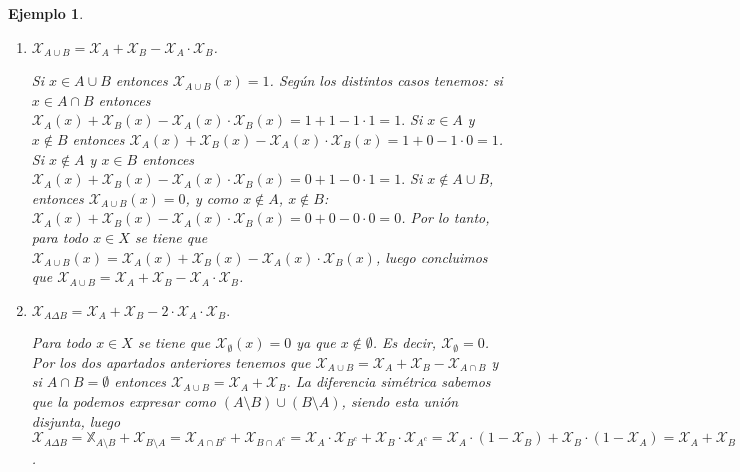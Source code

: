 \documentclass[12pt]{article}
\newtheorem{example}{Ejemplo}[theorem]
\begin{document}
\begin{example}
\begin{enumerate}
Si $x \in A \cap B$ entonces $x \in A$ y $x \in B$, luego $\mathcal{X}_{A\cap B} = 1$, y $\mathcal{X}_A = 1$, $\mathcal{X}_B=1$. Es decir, si $x \in A \cap B$ entonces $\mathcal{X}_{A\cap B}(x) = \mathcal{X}_A(x) \cdot \mathcal{X}_B(x)$. Por otra parte, si $x \notin \mathcal{X}_{A\cap B}$ entonces $x \notin A$ ó $x \notin B$, luego $\mathcal{X}_{A\cap B}(x)=0$ y ó $\mathcal{X}_A(x)=0$ ó $\mathcal{X}_B(x)=0$. Por lo tanto, si $x \notin A \cap B$ entonces también se tiene que $\mathcal{X}_{A\cap B}(x) = \mathcal{X}_A(x) \cdot \mathcal{X}_B(x)$. Concluimos que $\mathcal{X}_{A\cap B} = \mathcal{X}_A \cdot \mathcal{X}_B$.
\item $\mathcal{X}_{A\cup B} = \mathcal{X}_A + \mathcal{X}_B - \mathcal{X}_A \cdot \mathcal{X}_B$.

Si $x \in A \cup B$ entonces $\mathcal{X}_{A\cup B}(x) = 1$. Según los distintos casos tenemos: si $x \in A \cap B$ entonces $\mathcal{X}_A(x)+ \mathcal{X}_B(x)-\mathcal{X}_A(x) \cdot \mathcal{X}_B(x) = 1+1-1\cdot 1 = 1.$ Si $x \in A$ y $x\notin B$ entonces $\mathcal{X}_A(x)+ \mathcal{X}_B(x)-\mathcal{X}_A(x) \cdot \mathcal{X}_B(x) =1+0 - 1 \cdot 0 = 1$. Si $x \notin A$ y $x \in B$ entonces $\mathcal{X}_A(x)+ \mathcal{X}_B(x)-\mathcal{X}_A(x) \cdot \mathcal{X}_B(x) = 0 + 1 -0 \cdot 1 = 1.$ Si $x \notin A \cup B$, entonces $\mathcal{X}_{A\cup B}(x)=0$, y como $x \notin A$, $x \notin B$: $\mathcal{X}_A(x)+ \mathcal{X}_B(x)-\mathcal{X}_A(x) \cdot \mathcal{X}_B(x) = 0 + 0 - 0 \cdot 0 =0$. Por lo tanto, para todo $x \in X$ se tiene que $\mathcal{X}_{A\cup B}(x)= \mathcal{X}_A(x)+ \mathcal{X}_B(x)-\mathcal{X}_A(x) \cdot \mathcal{X}_B(x)$, luego concluimos que $\mathcal{X}_{A\cup B} = \mathcal{X}_A+ \mathcal{X}_B-\mathcal{X}_A \cdot \mathcal{X}_B$.
\item $\mathcal{X}_{A \Delta B} = \mathcal{X}_A + \mathcal{X}_B - 2 \cdot \mathcal{X}_A \cdot \mathcal{X}_B.$

Para todo $x \in X$ se tiene que $\mathcal{X}_\emptyset(x) = 0$ ya que $ x\notin \emptyset$. Es decir, $\mathcal{X}_\emptyset = 0$. Por los dos apartados anteriores tenemos que $\mathcal{X}_{A\cup B} = \mathcal{X}_A + \mathcal{X}_B - \mathcal{X}_{A\cap B}$ y si $A \cap B = \emptyset$ entonces $\mathcal{X}_{A\cup B} = \mathcal{X}_A + \mathcal{X}_B$. La diferencia simétrica sabemos que la podemos expresar como $(A \setminus B) \cup (B \setminus A)$, siendo esta unión disjunta, luego $\mathcal{X}_{A\Delta B} = \mathbb{X}_{A \setminus B} + \mathcal{X}_{B\setminus A} = \mathcal{X}_{A\cap B^c} + \mathcal{X}_{B\cap A^c} = \mathcal{X}_A \cdot \mathcal{X}_{B^c} + \mathcal{X}_B \cdot \mathcal{X}_{A^c} = \mathcal{X}_A \cdot(1 - \mathcal{X}_B) + \mathcal{X}_B \cdot (1- \mathcal{X}_A) = \mathcal{X}_A + \mathcal{X}_B -2 \cdot \mathcal{X}_A \cdot \mathcal{X}_B$.
\end{enumerate}


\end{example}
\end{document}
